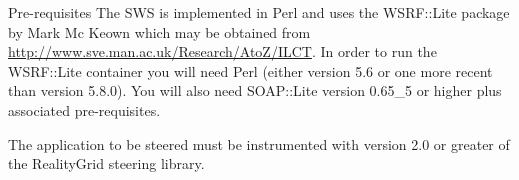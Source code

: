 \documentclass[a4paper]{article}
\begin{document}

\begin{section}{Pre-requisites}
The SWS is implemented in Perl and uses the WSRF::Lite package by Mark
Mc Keown which may be obtained from
\url{http://www.sve.man.ac.uk/Research/AtoZ/ILCT}.  In order to run
the WSRF::Lite container you will need Perl (either version 5.6 or
one more recent than version 5.8.0).  You will also need SOAP::Lite version
0.65\_5 or higher plus associated pre-requisites.

The application to be steered must be instrumented with version 2.0 or
greater of the RealityGrid steering library.
\end{section}

\end{document}
